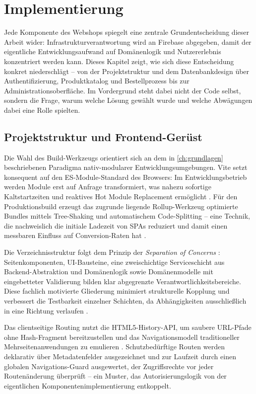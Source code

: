 ﻿%
\chapter{Implementierung}
\label{ch:implementierung}

Jede Komponente des Webshops spiegelt eine zentrale Grundentscheidung dieser Arbeit wider: Infrastrukturverantwortung wird an Firebase abgegeben, damit der eigentliche Entwicklungsaufwand auf Domänenlogik und Nutzererlebnis konzentriert werden kann. Dieses Kapitel zeigt, wie sich diese Entscheidung konkret niederschlägt -- von der Projektstruktur und dem Datenbankdesign über Authentifizierung, Produktkatalog und Bestellprozess bis zur Administrationsoberfläche. Im Vordergrund steht dabei nicht der Code selbst, sondern die Frage, warum welche Lösung gewählt wurde und welche Abwägungen dabei eine Rolle spielten.

\section{Projektstruktur und Frontend-Gerüst}
\label{sec:projektstruktur}

Die Wahl des Build-Werkzeugs orientiert sich an dem in \autoref{ch:grundlagen} beschriebenen Paradigma nativ-modularer Entwicklungsumgebungen. Vite setzt konsequent auf den ES-Module-Standard des Browsers: Im Entwicklungsbetrieb werden Module erst auf Anfrage transformiert, was nahezu sofortige Kaltstart\-zeiten und reaktives Hot Module Replacement ermöglicht \cite{vite2025}. Für den Produktionsbuild erzeugt das zugrunde liegende Rollup-Werkzeug optimierte Bundles mittels Tree-Shaking und automatischem Code-Splitting -- eine Technik, die nachweislich die initiale Ladezeit von SPAs reduziert und damit einen messbaren Einfluss auf Conversion-Raten hat \cite{peterson2018, kothapalli2022}.

Die Verzeichnisstruktur folgt dem Prinzip der \textit{Separation of Concerns} \cite{kothapalli2021}: Seitenkomponenten, UI-Bausteine, eine zweischichtige Serviceschicht aus Backend-Abstraktion und Domänenlogik sowie Domänenmodelle mit eingebetteter Validierung bilden klar abgegrenzte Verantwortlichkeitsbereiche. Diese fachlich motivierte Gliederung minimiert strukturelle Kopplung und verbessert die Testbarkeit einzelner Schichten, da Abhängigkeiten ausschließlich in eine Richtung verlaufen \cite{kothapalli2022}.

Das clientseitige Routing nutzt die HTML5-History-API, um saubere URL-Pfade ohne Hash-Fragment bereitzustellen und das Navigationsmodell traditioneller Mehrseitenanwendungen zu emulieren \cite{kothapalli2022}. Schutzbedürftige Routen werden deklarativ über Metadatenfelder ausgezeichnet und zur Laufzeit durch einen globalen Navigations-Guard ausgewertet, der Zugriffsrechte vor jeder Routenänderung überprüft -- ein Muster, das Autorisierungslogik von der eigentlichen Komponentenimplementierung entkoppelt.

